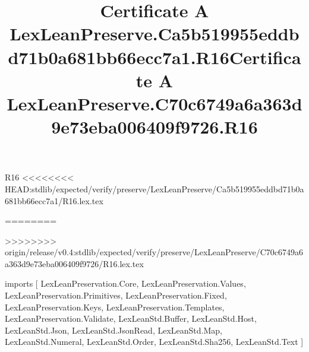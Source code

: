 \begin{lexlean}{R16}
<<<<<<<< HEAD:stdlib/expected/verify/preserve/LexLeanPreserve/Ca5b519955eddbd71b0a681bb66ecc7a1/R16.lex.tex
\title{Certificate A LexLeanPreserve.Ca5b519955eddbd71b0a681bb66ecc7a1.R16}
========
\title{Certificate A LexLeanPreserve.C70c6749a6a363d9e73eba006409f9726.R16}
>>>>>>>> origin/release/v0.4:stdlib/expected/verify/preserve/LexLeanPreserve/C70c6749a6a363d9e73eba006409f9726/R16.lex.tex
\begin{coremodule}
imports [
  LexLeanPreservation.Core,
  LexLeanPreservation.Values,
  LexLeanPreservation.Primitives,
  LexLeanPreservation.Fixed,
  LexLeanPreservation.Keys,
  LexLeanPreservation.Templates,
  LexLeanPreservation.Validate,
  LexLeanStd.Buffer,
  LexLeanStd.Host,
  LexLeanStd.Json,
  LexLeanStd.JsonRead,
  LexLeanStd.Map,
  LexLeanStd.Numeral,
  LexLeanStd.Order,
  LexLeanStd.Sha256,
  LexLeanStd.Text
]


\end{coremodule}
\end{lexlean}
